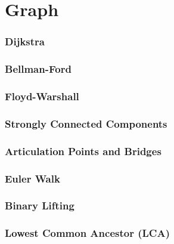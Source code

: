 \chapter{Graph}

\subsection{Dijkstra}

\subsection{Bellman-Ford}

\subsection{Floyd-Warshall}

\subsection{Strongly Connected Components}

\subsection{Articulation Points and Bridges}

\subsection{Euler Walk}

\subsection{Binary Lifting}

\subsection{Lowest Common Ancestor (LCA)}

